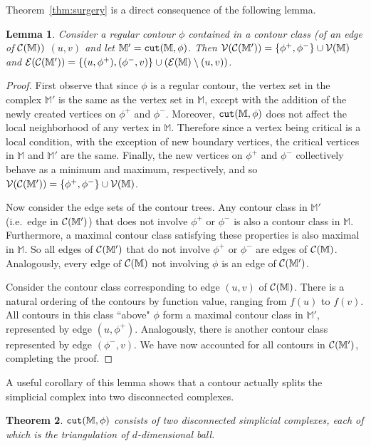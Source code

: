 \documentclass[11pt]{article}
\newtheorem{theorem}{Theorem}[section]
\newtheorem{lemma}[theorem]{Lemma}
\theoremstyle{definition}
\newcommand{\cC}{{\cal C}}
\newcommand{\cE}{{\cal E}}
\newcommand{\cV}{{\cal V}}
\newcommand{\MM}{\mathbb{M}}
\newcommand{\cut}{{\tt cut}}
\newcommand{\reeb}{\cC}
\begin{document}
Theorem~\ref{thm:surgery} is a direct consequence of the following lemma. 

\begin{lemma} \label{lem:cut} Consider a regular contour $\phi$ contained in a contour class (of an edge of $\reeb(\MM))$
$(u,v)$ and let $\MM' = \cut(\MM,\phi)$. Then $\cV(\reeb(\MM')) = \{\phi^+,\phi^-\} \cup \cV(\MM)$
and $\cE(\reeb(\MM')) = \{(u,\phi^+),(\phi^-,v)\} \cup (\cE(\MM) \setminus (u,v))$.
\end{lemma}

\begin{proof} First observe that since $\phi$ is a regular contour, the vertex set in the complex $\MM'$ is the same 
as the vertex set in $\MM$, except with the addition of the newly created vertices on $\phi^+$ and $\phi^-$.  
Moreover, $\cut(\MM,\phi)$ does not affect the local neighborhood of any vertex in $\MM$. 
Therefore since a vertex being critical is a local condition, with the exception of new boundary vertices, the 
critical vertices in $\MM$ and $\MM'$ are the same.  Finally, the new vertices on $\phi^+$ and $\phi^-$ 
collectively behave as a minimum and maximum, respectively, and so $\cV(\reeb(\MM')) = \{\phi^+,\phi^-\} \cup \cV(\MM)$.

Now consider the edge sets of the contour trees.  Any contour class in $\MM'$ (i.e.\ edge in $\cC(\MM')$) that does not involve $\phi^+$ or $\phi^-$ is also
a contour class in $\MM$. Furthermore, a maximal contour class satisfying these properties is also
maximal in $\MM$. So all edges of $\cC(\MM')$ that do not involve $\phi^+$ or $\phi^-$ are edges of $\cC(\MM)$.
Analogously, every edge of $\cC(\MM)$ not involving $\phi$ is an edge of $\cC(\MM')$.

Consider the contour class corresponding to edge $(u,v)$ of $\cC(\MM)$. There is a natural ordering
of the contours by function value, ranging from $f(u)$ to $f(v)$. All contours in this class ``above" $\phi$
form a maximal contour class in $\MM'$, represented by edge $(u,\phi^+)$. Analogously, there is another
contour class represented by edge $(\phi^-,v)$. We have now accounted for all contours in $\cC(\MM')$,
completing the proof.
\end{proof}

A useful corollary of this lemma shows that a contour actually splits the simplicial complex into
two disconnected complexes.

\begin{theorem} \label{thm:jordan} $\cut(\MM,\phi)$ consists of two
disconnected simplicial complexes, each of which
is the triangulation of $d$-dimensional ball.
\end{theorem}
\end{document}
